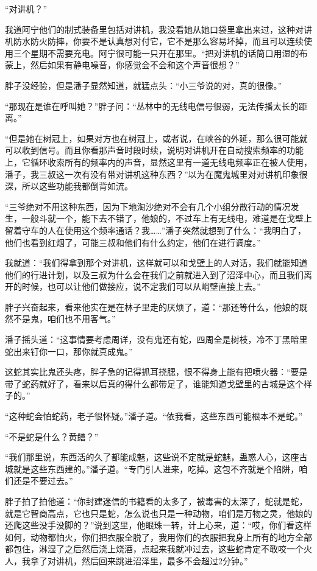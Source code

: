“对讲机？”

我道阿宁他们的制式装备里包括对讲机，我没看她从她口袋里拿出来过，这种对讲机防水防火防摔，你要不是认真想对付它，它不是那么容易坏掉，而且可以连续使用三个星期不需要充电。阿宁很可能一只开在那里。“把对讲机的话筒口用湿的布蒙上，然后如果有静电噪音，你感觉会不会和这个声音很想？”

胖子没经验，但是潘子显然知道，就猛点头：“小三爷说的对，真的很像。”

“那现在是谁在呼叫她？”胖子问：“丛林中的无线电信号很弱，无法传播太长的距离。”

“但是她在树冠上，如果对方也在树冠上，或者说，在峡谷的外延，那么很可能就可以收到信号。而且你看那声音时段时续，说明对讲机开在自动搜索频率的功能上，它循环收索所有的频率内的声音，显然这里有一道无线电频率正在被人使用，潘子，我三叔这一次有没有带对讲机这种东西？”以为在魔鬼城里对对讲机印象很深，所以这些功能我都倒背如流。

“三爷绝对不用这种东西，因为下地淘沙绝对不会有几个小组分散行动的情况发生，一般斗就一个，能下去不错了，他娘的，不过车上有无线电，难道是在戈壁上留着守车的人在使用这个频率通话？我……”潘子突然就想到了什么：“我明白了，他们也看到红烟了，可能三叔和他们有什么约定，他们在进行调度。”

我就道：“我们得拿到那个对讲机，这样就可以和戈壁上的人对话，我们就能知道他们的行进计划，以及三叔为什么会在我们之前就进入到了沼泽中心，而且我们离开的时候，也可以让他们做接应，说不定我们可以从峭壁直接上去。”

胖子兴奋起来，看来他实在是在林子里走的厌烦了，道：“那还等什么，他娘的既然不是鬼，咱们也不用客气。”

潘子摇头道：“这事情要考虑周详，没有鬼还有蛇，四周全是树枝，冷不丁黑暗里蛇出来钉你一口，那你就真成鬼。”

这蛇其实比鬼还头疼，胖子急的记得抓耳挠腮，恨不得身上能有把喷火器：“要是带了蛇药就好了，看来以后真的得什么都带足了，谁能知道戈壁里的古城是这个样子的。”

“这种蛇会怕蛇药，老子很怀疑。”潘子道。“依我看，这些东西可能根本不是蛇。”

“不是蛇是什么？黄鳝？”

“我们那里说，东西活的久了都能成魅，这些说不定就是蛇魅，蛊惑人心，这座古城就是这些东西建的。”潘子道。“专门引人进来，吃掉。这包不齐就是个陷阱，咱们还是不要过去。”

胖子拍了拍他道：“你封建迷信的书籍看的太多了，被毒害的太深了，蛇就是蛇，就是它智商高点，它也只是蛇，怎么说也只是一种动物，咱们是万物之灵，他娘的还爬这些没手没脚的？”说到这里，他眼珠一转，计上心来，道：“哎，你们看这样如何，动物都怕火，你们把衣服全脱了，我用你们的衣服把我身上所有的地方全部都包住，淋湿了之后然后浇上烧酒，点起来我就冲过去，这些蛇肯定不敢咬一个火人，我拿了对讲机，然后回来跳进沼泽里，最多不会超过2分钟。”

